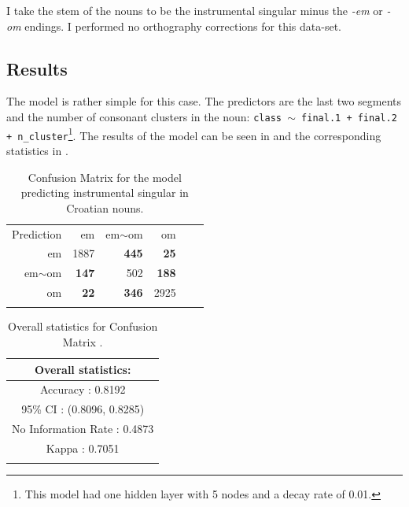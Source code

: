 I take the stem of the nouns to be the instrumental singular minus the \textit{-em} or \textit{-om} endings. I performed no orthography corrections for this data-set.

\subsection{Results}

The model is rather simple for this case. The predictors are the last two segments and the number of consonant clusters in the noun: \texttt{class $\sim$ final.1 + final.2 + n\_cluster}\footnote{This model had one hidden layer with 5 nodes and a decay rate of 0.01.}. The results of the model can be seen in  and the corresponding statistics in .

\begin{table}
  \centering
  \begin{tabular}{rrrrrr}
    \lsptoprule
    \multicolumn{4}{c}{Reference}                           \\
    \midrule
    Prediction & em           & em$\sim$om   & om           \\
    em         & 1887         & \textbf{445} & \textbf{25}  \\
    em$\sim$om & \textbf{147} & 502          & \textbf{188} \\
    om         & \textbf{22}  & \textbf{346} & 2925         \\
    \lspbottomrule
  \end{tabular}
  \caption{Confusion Matrix for the model predicting instrumental singular in Croatian nouns.}\label{tab:ins-cro}
\end{table}

\begin{table}
  \centering
  \begin{tabular}{c}
    \lsptoprule
    Overall statistics:          \\
    \midrule
    Accuracy : 0.8192            \\
    95\% CI : (0.8096, 0.8285)   \\
    No Information Rate : 0.4873 \\
    Kappa : 0.7051               \\
    \lspbottomrule
  \end{tabular}
  \caption{Overall statistics for Confusion Matrix .}\label{tab:ins-cro-stats}
\end{table}

